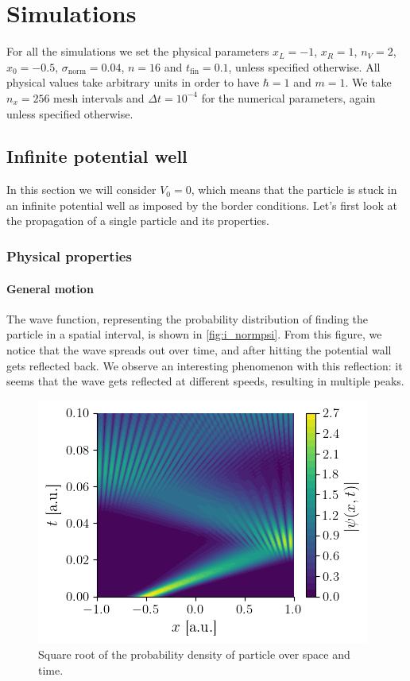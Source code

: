 \section{Simulations}

For all the simulations we set the physical parameters \(x_L = -1\), \(x_R = 1\), $n_V = 2$, \(x_0 = -0.5\), \mbox{\(\sigma_\textrm{norm} = 0.04\)}, \(n = 16\) and \(t_\textrm{fin} = 0.1\), unless specified otherwise. All physical values take arbitrary units in order to have \(\hbar = 1\) and $m=1$. We take \(n_x = 256\) mesh intervals and \(\Delta t = 10^{-4}\) for the numerical parameters, again unless specified otherwise.

\subsection{Infinite potential well}

In this section we will consider \(V_0 = 0\), which means that the particle is stuck in an infinite potential well as imposed by the border conditions. Let's first look at the propagation of a single particle and its properties.

\subsubsection{Physical properties}

\paragraph{General motion} The wave function, representing the probability distribution of finding the particle in a spatial interval, is shown in \autoref{fig:i_normpsi}. From this figure, we notice that the wave spreads out over time, and after hitting the potential wall gets reflected back. We observe an interesting phenomenon with this reflection: it seems that the wave gets reflected at different speeds, resulting in multiple peaks.

\begin{figure}[h]
    \centering
    \includegraphics[width=0.6\linewidth]{figures/i_normpsi.png}
    \caption{Square root of the probability density of particle over space and time.}
    \label{fig:i_normpsi}
\end{figure}

